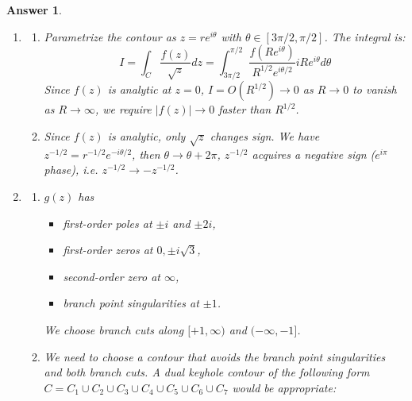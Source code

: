 \documentclass[a4paper]{article}
\newtheorem{ans}{Answer}[section]
\theoremstyle{new}
\begin{document}
\newpage
\begin{ans}\leavevmode
\begin{enumerate}[label=(\alph*)]
\item 
\begin{enumerate}[label=(\roman*)]
\item Parametrize the contour as $z=re^{i\theta}$ with $\theta\in[3\pi/2,\pi/2]$. The integral is:
$$I=\int_C\frac{f(z)}{\sqrt{z}}dz=\int_{3\pi/2}^{\pi/2}\frac{f(Re^{i\theta})}{R^{1/2}e^{i\theta/2}}iRe^{i\theta}d\theta$$
Since $f(z)$ is analytic at $z=0$, $I=O(R^{1/2})\rightarrow 0$ as $R\rightarrow 0$ to vanish as $R\rightarrow\infty$, we require $|f(z)|\rightarrow 0$ faster than $R^{1/2}$.
\item Since $f(z)$ is analytic, only $\sqrt{z}$ changes sign. We have $z^{-1/2}=r^{-1/2}e^{-i\theta/2}$, then $\theta\rightarrow\theta+2\pi$, $z^{-1/2}$ acquires a negative sign ($e^{i\pi}$ phase), i.e. $z^{-1/2}\rightarrow -z^{-1/2}$.
\end{enumerate}
\item 
\begin{enumerate}[label=(\roman*)]
\item $g(z)$ has 
\begin{itemize}
    \item first-order poles at $\pm i$ and $\pm 2i$,
    \item first-order zeros at $0,\pm i\sqrt{3}$,
    \item second-order zero at $\infty$,
    \item branch point singularities at $\pm 1$.
\end{itemize}
We choose branch cuts along $[+1,\infty)$ and $(-\infty,-1]$.
\item We need to choose a contour that avoids the branch point singularities and both branch cuts. A dual keyhole contour of the following form $C=C_1\cup C_2\cup C_3\cup C_4\cup C_5\cup C_6\cup C_7$ would be appropriate:
 \begin{center}
\end{center}
\end{enumerate}
\end{enumerate}
\end{ans}
\end{document}
